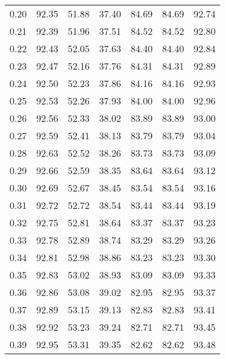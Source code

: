 \begin{tabular}{|c|c|c|c|c|c|c|}
      0.20 &     92.35 &     51.88 &      37.40 &   84.69 &      84.69 &         92.74 \\
      0.21 &     92.39 &     51.96 &      37.51 &   84.52 &      84.52 &         92.80 \\
      0.22 &     92.43 &     52.05 &      37.63 &   84.40 &      84.40 &         92.84 \\
      0.23 &     92.47 &     52.16 &      37.76 &   84.31 &      84.31 &         92.89 \\
      0.24 &     92.50 &     52.23 &      37.86 &   84.16 &      84.16 &         92.93 \\
      0.25 &     92.53 &     52.26 &      37.93 &   84.00 &      84.00 &         92.96 \\
      0.26 &     92.56 &     52.33 &      38.02 &   83.89 &      83.89 &         93.00 \\
      0.27 &     92.59 &     52.41 &      38.13 &   83.79 &      83.79 &         93.04 \\
      0.28 &     92.63 &     52.52 &      38.26 &   83.73 &      83.73 &         93.09 \\
      0.29 &     92.66 &     52.59 &      38.35 &   83.64 &      83.64 &         93.12 \\
      0.30 &     92.69 &     52.67 &      38.45 &   83.54 &      83.54 &         93.16 \\
      0.31 &     92.72 &     52.72 &      38.54 &   83.44 &      83.44 &         93.19 \\
      0.32 &     92.75 &     52.81 &      38.64 &   83.37 &      83.37 &         93.23 \\
      0.33 &     92.78 &     52.89 &      38.74 &   83.29 &      83.29 &         93.26 \\
      0.34 &     92.81 &     52.98 &      38.86 &   83.23 &      83.23 &         93.30 \\
      0.35 &     92.83 &     53.02 &      38.93 &   83.09 &      83.09 &         93.33 \\
      0.36 &     92.86 &     53.08 &      39.02 &   82.95 &      82.95 &         93.37 \\
      0.37 &     92.89 &     53.15 &      39.13 &   82.83 &      82.83 &         93.41 \\
      0.38 &     92.92 &     53.23 &      39.24 &   82.71 &      82.71 &         93.45 \\
      0.39 &     92.95 &     53.31 &      39.35 &   82.62 &      82.62 &         93.48 \\

\end{tabular}
